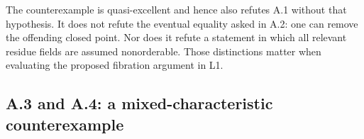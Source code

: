 \begin{remark}
The counterexample is quasi-excellent and hence also refutes A.1 without that hypothesis. It does not refute the eventual equality asked in A.2: one can remove the offending closed point. Nor does it refute a statement in which all relevant residue fields are assumed nonorderable. Those distinctions matter when evaluating the proposed fibration argument in L1.
\end{remark}













\subsection{A.3 and A.4: a mixed-characteristic counterexample}

